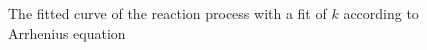 \documentclass[%
 reprint,
 amsmath,amssymb,
 aps,
10.5pt,
]{revtex4-1}
\begin{document}
\maketitle
\begin{figure}[h]
\centering
{}
\caption{The fitted curve of the reaction process with a fit of $k$ according to Arrhenius equation}
\end{figure}
\end{document}
